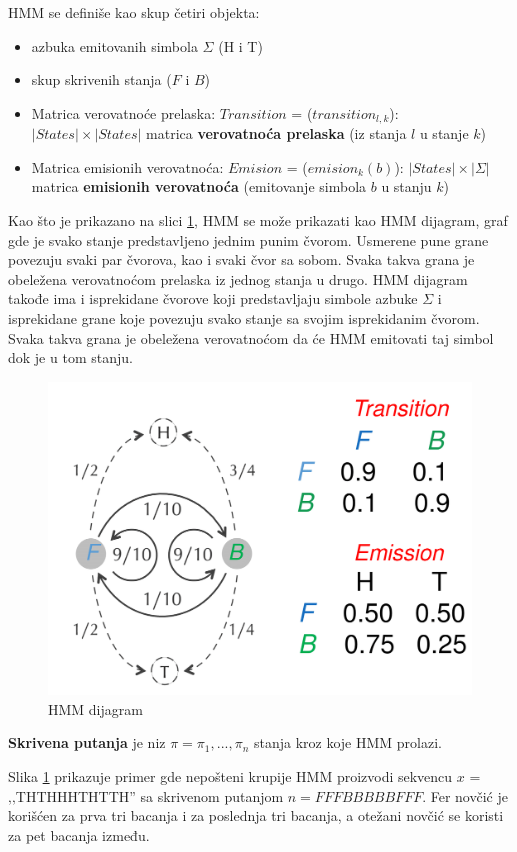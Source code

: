 HMM se definiše kao skup četiri objekta:
\begin{itemize}
    \item azbuka emitovanih simbola $ \Sigma $ (H i T)
    \item skup skrivenih stanja ($ F $ i $ B $)
    \item Matrica verovatnoće prelaska: $ Transition $ = ($ transition_{l,k} $): $ |States| \times |States| $ matrica
    \textbf{verovatnoća prelaska} (iz stanja $ l $ u stanje $ k $)
    \item Matrica emisionih verovatnoća: $ Emision $ = ($ emision_k(b) $): $ |States| \times |\Sigma| $ matrica
    \textbf{emisionih verovatnoća} (emitovanje simbola $ b $ u stanju $ k $)
\end{itemize}

Kao što je prikazano na slici \ref{slika: hmm}, HMM se može prikazati kao HMM dijagram, graf gde je svako stanje predstavljeno jednim punim čvorom. Usmerene pune grane povezuju svaki par čvorova, kao i svaki čvor sa sobom. Svaka takva grana je obeležena verovatnoćom prelaska iz jednog stanja u drugo. HMM dijagram takođe ima i isprekidane čvorove koji predstavljaju simbole azbuke $ \Sigma $ i isprekidane grane koje povezuju svako stanje sa svojim isprekidanim čvorom. Svaka takva grana je obeležena verovatnoćom da će HMM emitovati taj simbol dok je u tom stanju.

\begin{figure}[H]
\centering
\includegraphics[width=0.5 \textwidth]{poglavlja/10/slike/HMM-dijagram.png}
\caption{HMM dijagram}
\label{slika: hmm}
\end{figure}



\begin{definicija}
    \textbf{Skrivena putanja} je niz $ \pi = \pi_1, ... , \pi_n $ stanja kroz koje HMM prolazi.
\end{definicija}

Slika \ref{slika: hmm} prikazuje primer gde nepošteni krupije HMM proizvodi sekvencu $ x $ = ‚‚THTHHHTHTTH'' sa skrivenom putanjom $ n = FFFBBBBBFFF $. Fer novčić je korišćen za prva tri bacanja i za poslednja tri bacanja, a otežani novčić se koristi za pet bacanja između.

